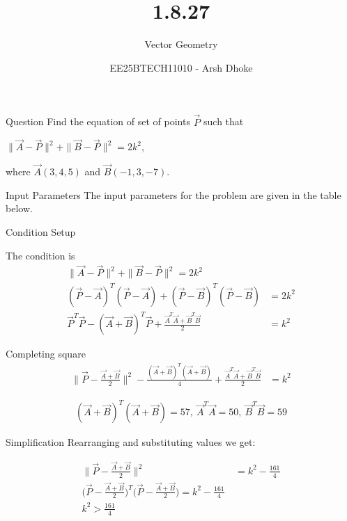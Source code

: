 \documentclass{beamer}
\title{1.8.27}
\subtitle{Vector Geometry}
\author{EE25BTECH11010 - Arsh Dhoke}
\date{}
\begin{document}
\begin{frame}
\titlepage
\end{frame}

\begin{frame}{Question}
Find the equation of set of points $\vec{P}$ such that 

$\|\vec{A}-\vec{P}\|^2 + \|\vec{B}-\vec{P}\|^2 = 2k^2$,

where $\vec{A}(3,4,5)$ and $\vec{B}(-1,3,-7)$.
\end{frame}

\begin{frame}{Input Parameters}
The input parameters for the problem are given in the table below.

\end{frame}

\begin{frame}{Condition Setup}

The condition is
\begin{align}
\|\vec{A}-\vec{P}\|^2 + \|\vec{B}-\vec{P}\|^2 = 2k^2 \\
(\vec{P}-\vec{A})^T(\vec{P}-\vec{A}) + (\vec{P}-\vec{B})^T(\vec{P}-\vec{B}) &= 2k^2 \\
\vec{P}^T\vec{P} - (\vec{A}+\vec{B})^T\vec{P} + \frac{\vec{A}^T\vec{A}+\vec{B}^T\vec{B}}{2}
&= k^2 
\end{align}
\end{frame}

\begin{frame}{Completing square}
\begin{align}
\Big\|\vec{P}-\frac{\vec{A}+\vec{B}}{2}\Big\|^2
- \frac{(\vec{A}+\vec{B})^T(\vec{A}+\vec{B})}{4}
+ \frac{\vec{A}^T\vec{A}+\vec{B}^T\vec{B}}{2}
&= k^2
\end{align}

\begin{align}
(\vec{A}+\vec{B})^T(\vec{A}+\vec{B})=57,\ \vec{A}^T\vec{A}=50,\ \vec{B}^T\vec{B}=59
\end{align}
\end{frame}

\begin{frame}{Simplification}
Rearranging and substituting values we get:

\begin{align} 
\Big\|\vec{P}-\frac{\vec{A}+\vec{B}}{2}\Big\|^2
&= k^2 - \frac{161}{4} \\
\Big(\vec{P}-\frac{\vec{A}+\vec{B}}{2}\Big)^T
\Big(\vec{P}-\frac{\vec{A}+\vec{B}}{2}\Big)
= k^2 - \frac{161}{4}\ \\
k^2>\frac{161}{4}
\end{align}

\end{frame}
\end{document}
